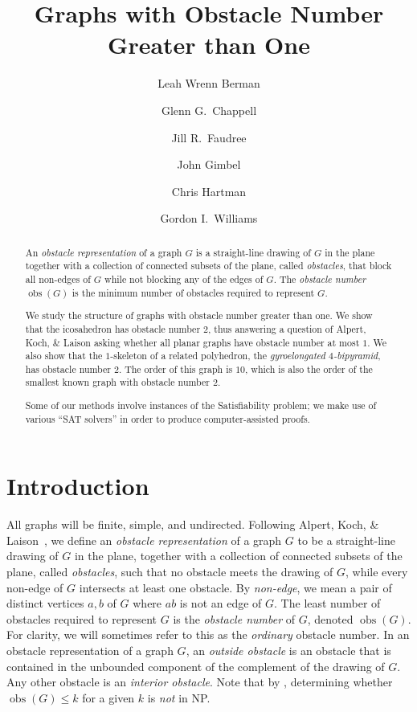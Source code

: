 \documentclass[12pt]{amsart}
\title{Graphs with Obstacle Number Greater than One}
\author{Leah Wrenn Berman}
\author{Glenn G.~Chappell}
\author{Jill R.~Faudree}
\author{John Gimbel}\thanks{John Gimbel's research was partially supported by the Czech Ministry of Education Grant \#ERC-CZ 1201}
\author{Chris Hartman}
\author{Gordon I.~Williams}
\theoremstyle{remark}
\DeclareMathOperator{\obs}{\ensuremath{\mathrm{obs}}}
\begin{document}

\begin{abstract}
An \emph{obstacle representation} of a graph $G$
is a straight-line drawing of $G$ in the plane
together with a collection of connected subsets of the plane,
called \emph{obstacles}, that block all non-edges
of $G$ while not blocking any of the edges of $G$.
The \emph{obstacle number} $\obs(G)$ is
the minimum number of obstacles required to represent $G$.

We study the structure of graphs
with obstacle number greater than one.
We show that the icosahedron has obstacle number $2$,
thus answering a question of
Alpert, Koch, \& Laison asking whether all planar graphs
have obstacle number at most $1$.
We also show that the $1$-skeleton of
a related polyhedron, the \emph{gyroelongated $4$-bipyramid},
has obstacle number $2$.
The order of this graph is $10$,
which is also the order of the smallest known graph with
obstacle number $2$.

Some of our methods involve instances of the Satisfiability problem;
we make use of various ``SAT solvers'' in order to produce
computer-assisted proofs.
\end{abstract}

\maketitle



\section{Introduction}

All graphs will be finite, simple, and undirected.
Following Alpert, Koch, \& Laison~\cite{AlpKocLai10}, we define an
 \emph{obstacle representation} of a graph $G$ to be
 a straight-line drawing of $G$ in the plane,
together with a collection of connected subsets of the plane,
called \emph{obstacles},
such that no obstacle meets the drawing of $G$,
while every non-edge of $G$ intersects at least one obstacle. By \emph{non-edge}, we mean a pair of distinct vertices $a,b$ of $G$ where $ab$ is not an edge of $G$.
The least number of obstacles required to represent $G$
is the \emph{obstacle number} of $G$,
denoted $\obs(G)$. For clarity, we will sometimes refer to this as the \emph{ordinary} obstacle number. In an obstacle representation of a graph $G$,
an \emph{outside obstacle} is an obstacle
that is contained in the unbounded component of
the complement of the drawing of $G$.
Any other obstacle is
an \emph{interior obstacle}. Note that by \cite{JohSar11}, determining whether $\obs(G)\le k$ for a given $k$ is \emph{not} in NP.
\end{document}
